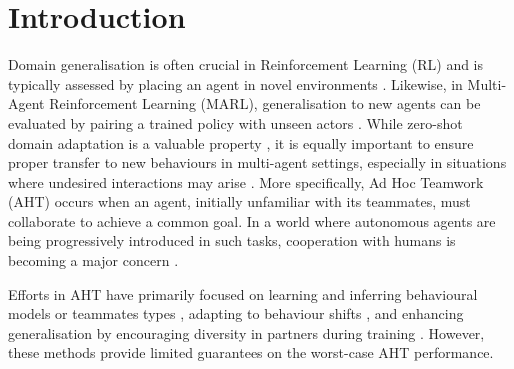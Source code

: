 
\section{Introduction}



Domain generalisation is often crucial in Reinforcement Learning (RL) and is typically assessed by placing an agent in novel environments \citep{cobbe_quantifying_generalization_reinforcement_2019}. Likewise, in Multi-Agent Reinforcement Learning (MARL), generalisation to new agents can be evaluated by pairing a trained policy with unseen actors \citep{barrett_empirical_evaluation_ad_2011, hu_other_play_zero_2020, leibo_scalable_evaluation_multi_2021, agapiou_melting_pot_2_2023}. While zero-shot domain adaptation is a valuable property \citep{higgins_darla_improving_zero_2017, schafer_task_generalisation_multi_2022}, it is equally important to ensure proper transfer to new behaviours in multi-agent settings, especially in situations where undesired interactions may arise \citep{gleave_adversarial_policies_attacking_2019}. More specifically, Ad Hoc Teamwork (AHT) occurs when an agent, initially unfamiliar with its teammates, must collaborate to achieve a common goal. In a world where autonomous agents are being progressively introduced in such tasks, cooperation with humans is becoming a major concern \citep{stone_ad_hoc_autonomous_2010, ji_ai_alignement_comprehensive_2023}.

Efforts in AHT have primarily focused on learning and inferring behavioural models or teammates types \citep{barrett_empirical_evaluation_ad_2011, albrecht_empirical_study_practical_2015, barrett_making_friends_fly_2017, chen_aateam_achieving_ad_2020, muglich_generalized_beliefs_cooperative_2022}, adapting to behaviour shifts \citep{manish_ad_hoc_teamwork_2019}, and enhancing generalisation by encouraging diversity in partners during training \citep{jaderberg_human_level_performance_2019,hu_other_play_zero_2020, charakorn_investigating_partner_diversification_2020,lupu_trajectory_diversity_zero_2021, strouse_collaboration_with_humans_2021}. However, these methods provide limited guarantees on the worst-case AHT performance.

